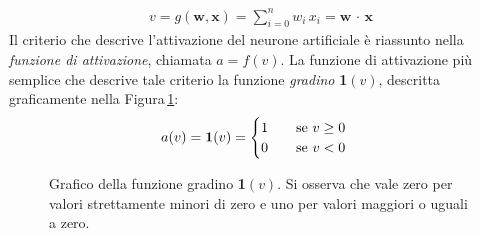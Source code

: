 % 
\begin{gather*}
    v = g\left(\mathbf{w}, \mathbf{x}\right) = \sum_{i = 0}^n w_i\,x_i = \mathbf{w}\,\cdot\,\mathbf{x}
\end{gather*}
% 
Il criterio che descrive l'attivazione del neurone artificiale è riassunto nella \textsl{funzione di attivazione}, chiamata $a = f(v)$. La funzione di attivazione più semplice che descrive tale criterio la funzione \textsl{gradino} \textbf{1}$(v)$, descritta graficamente nella Figura\,\ref{fig:step-function}:
% 
\begin{gather*}
    a(v) = \text{\textbf{1}}(v) =
    \begin{cases}
        1 \hspace{20px} \text{se } v\geq0\\
        0 \hspace{20px} \text{se } v<0
    \end{cases}
\end{gather*}
% 
\begin{figure}[!b]
    \centering
    
    \caption[Grafico della funzione gradino \textsl{1}$(v)$.]{Grafico della funzione gradino \textbf{1}$(v)$. Si osserva che vale zero per valori strettamente minori di zero e uno per valori maggiori o uguali a zero.}\label{fig:step-function}
\end{figure}

